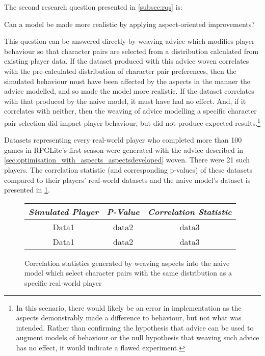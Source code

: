 The second research question presented in \cref{subsec:rqs} is:

\begin{researchquestion}
  Can a model be made more realistic by applying aspect-oriented improvements?
\end{researchquestion}

This question can be answered directly by weaving advice which modifies player
behaviour so that character pairs are selected from a distribution calculated
from existing player data. If the dataset produced with this advice woven
correlates with the pre-calculated distribution of character pair preferences,
then the simulated behaviour must have been affected by the aspects in the
manner the advice modelled, and so made the model more realistic. If the dataset
correlates with that produced by the naive model, it must have had no effect.
And, if it correlates with neither, then the weaving of advice modelling a
specific character pair selection did impact player behaviour, but did not
produce expected results.\footnote{In this scenario, there would likely be an
error in implementation as the aspects demonstrably made a difference to
behaviour, but not what was intended. Rather than confirming the hypothesis that
advice can be used to augment models of behaviour or the null hypothesis that
weaving such advice has no effect, it would indicate a flawed experiment.}

Datasets representing every real-world player who completed more than 100 games
in RPGLite's first season were generated with the advice described in
\cref{sec:optimisation_with_aspects_aspectsdeveloped} woven. There were 21 such
players. The \tau correlation statistic (and corresponding p-values) of these
datasets compared to their players'
real-world datasets and the naive model's dataset is presented in
\cref{fig:known_distribution_results_s1}.

\begin{figure}[h]
\begin{center}
  \begin{tabular}{c|c|c}
    \emph{Simulated Player} & \emph{P-Value} & \emph{Correlation Statistic} \\ \hline\hline
    Data1 & data2 & data3 \\
    Data1 & data2 & data3 \\
  \end{tabular}
  \caption{Correlation statistics generated by weaving aspects into the naive
    model which select character pairs with the same distribution as a specific
    real-world player}
  \label{fig:known_distribution_results_s1}
\end{center}
\end{figure}



